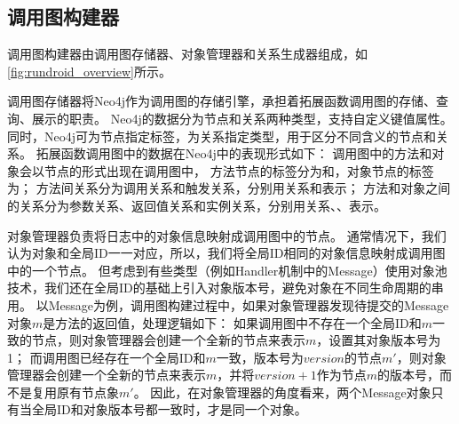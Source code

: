 \subsection{调用图构建器}

调用图构建器由调用图存储器、对象管理器和关系生成器组成，如\autoref{fig:rundroid_overview}所示。

调用图存储器将Neo4j\cite{Neo4jthe19}作为调用图的存储引擎，承担着拓展函数调用图的存储、查询、展示的职责。
Neo4j的数据分为节点和关系两种类型，支持自定义键值属性。
同时，Neo4j可为节点指定标签，为关系指定类型，用于区分不同含义的节点和关系。
拓展函数调用图中的数据在Neo4j中的表现形式如下：
调用图中的方法和对象会以节点的形式出现在调用图中， 方法节点的标签分为和，对象节点的标签为；
方法间关系分为调用关系和触发关系，分别用关系和表示；
方法和对象之间的关系分为参数关系、返回值关系和实例关系，分别用关系、、表示。






对象管理器负责将日志中的对象信息映射成调用图中的节点。
通常情况下，我们认为对象和全局ID一一对应，所以，我们将全局ID相同的对象信息映射成调用图中的一个节点。
但考虑到有些类型（例如Handler机制中的Message）使用对象池技术，我们还在全局ID的基础上引入对象版本号，避免对象在不同生命周期的串用。
以Message为例，调用图构建过程中，如果对象管理器发现待提交的Message对象$m$是方法的返回值，处理逻辑如下：
如果调用图中不存在一个全局ID和$m$一致的节点，则对象管理器会创建一个全新的节点来表示$m$，设置其对象版本号为1；
而调用图已经存在一个全局ID和$m$一致，版本号为$version$的节点$m'$，则对象管理器会创建一个全新的节点来表示$m$，并将$version + 1$作为节点$m$的版本号，而不是复用原有节点象$m'$。
因此，在对象管理器的角度看来，两个Message对象只有当全局ID和对象版本号都一致时，才是同一个对象。



